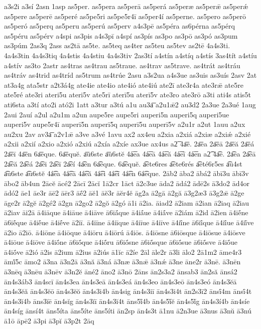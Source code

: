 {a3s2i
a3sí
2asn
1asp
as5per.
as5pera
as5perā
as5perá
as5peræ
as5perǣ
as5perǽ
as5pere
as5perē
as5peré
as5pe5ri
as5pe5r4ī
as5per4í
as5perne.
as5pero
as5perō
as5peró
as5perq
as5peru
as5perú
as5perv
a4s3pē
as5péra
as6pérna
as5pérq
as5péru
as5pérv
a4spi
as3pis
a4s3pī
a4spí
as3pís
as3po
as3pō
as3pó
as3pum
as3púm
2as3q
2ass
as2tā
as5te.
as5teq
as4ter
as5teu
as5tev
as2tē
4a4s3ti.
4a4s3tin
4a4s3tiq
4a4stis
4a4stiu
4a4s3tiv
2as3tí
a4stín
a4stíq
a4stís
3as4tít
a4stíu
a4stív
as3to
2astr
as4tras
as4trau
as5traue.
as4trav
as5trave.
as4trát
as4tráu
as4tráv
as4trid
as4tríd
as5trum
as4trúe
2asu
a3s2ua
a4s3ue
as3uis
as3uís
2asv
2at
at3a4g
ata5str
a2t3á4g
ate4ie
ate4io
ate4ió
ate4iú
ate2ī
ate3r4a
ate3rǣ
ate5re
ate5ré
ate3ri
ateri5u
ateri5v
ate5rī
aterī5u
aterī5v
ate3ro
ate3rō
a3ti
ati4s
atis5t
ati6sta
a3tí
ato2i
ató2i
1att
a3tur
a3tú
a1u
au3a͞
a2u1ǣ2
au3d2
2a3ue
2a3ué
1aug
2aui
2auí
a2ul
a2u1m
a2un
aupe5re
aupe5ri
auperi5n
auperi5q
auperi5ue
auperi5v
aupe5r4ī
auperī5n
auperī5q
auperī5u
auperī5v
a2u1r
a2ut
1auu
a2ux
au2xu
2av
av3a͞
a2v1ǣ
a3ve
a3vé
1avu
ax2
ax4eu
a2xia
a2xiá
a2xiæ
a2xiǽ
a2xié
a2xii
a2xií
a2xio
a2xió
a2xiú
a2xía
a2xíe
ax3ue
ax4us
a2͞
4a͞e.
2a͞ea
2a͞eā
2a͞eă
2a͞eá
2a͞eī
4a͞en
6a͞eque.
6a͞equĕ.
a͞u6ste
a͞u6stĕ
4á͞ea
4á͞eā
4á͞eă
4á͞eī
4á͞en
a2͡
4a͡e.
2a͡ea
2a͡eā
2a͡eă
2a͡eá
2a͡ei
2a͡eī
2a͡eí
4a͡en
6a͡eque.
6a͡equĕ.
a͡ete6res
a͡ete6rés
a͡eté6r5es
a͡u4st
a͡u6ste
a͡u6stĕ
4á͡ea
4á͡eā
4á͡eă
4á͡ei
4á͡eī
4á͡en
6á͡eque.
2āb2
āba2
ābá2
ābī3u
ābī3v
ābo2
āb4un
2ācĕ
ācé2
2ācī
2ācĭ
1ā2cr
1āct
ā2c3ue
āda2
ādá2
ādē2s
ā3do2
ād4or
ādó2
āe1
āe3r
āē2
āēr3
āḗ2
āĕ1
āĕ3r
āĕr4ĕ
āg2a
ā2gā
ā2gă
ā3g2æ3
ā3g2ǣ
ā2ge
āge2r
ā2gĕ
ā2gé2
ā2gn
ā2go2
ā2gŏ
ā2gó
ā1i
ā2ia.
āiad2
ā2iam
ā2ian
ā2iaq
ā2iau
ā2iav
āi2ā
ā4iāque
ā4iāue
ā4iāve
ā6iā́que
ā4iā́ue
ā4iā́ve
ā2iám
ā2id
ā2ien
ā4iḗne
ā6iḗque
ā4iḗue
ā4iḗve
ā2iī.
ā4iīne
ā4iīque
ā4iīue
ā4iīve
ā4iī́ne
ā6iī́que
ā4iī́ue
ā4iī́ve
ā2io
ā2iō.
ā4iōne
ā4iōque
ā4iōru
ā4iōrú
ā4iōs.
ā4iōsne
ā6iōsque
ā4iōsue
ā4iōsve
ā4iōue
ā4iōve
ā4iṓne
ā6iṓque
ā4iṓru
ā6iṓsne
ā6iṓsque
ā6iṓsue
ā6iṓsve
ā4iṓue
ā4iṓve
ā2ió
ā2is
ā2ium
ā2ius
ā2iús
ā1ĭc
ā2íe
2āl
āle2r
ā3li
ālo2
2ā1m2
āme4r3
āmĭ́5c
āmo2
ā3na
ā3n2ā
ā3nă
ā3ná
ā3næ
ā3nǣ
ā3nǽ
ā3ne
āne2r
ā3nē.
ā3nēn
ā3nēq
ā3nēu
ā3nēv
ā3n2ĕ
āné2
āno2
ā3nō
2āns
ān2s3a2
ānsab3
ān2să
ānsá2
ān4s3áb3
ān4scī
ān4s3ea
ān4s3eā
ān4s3eá
ān4s3eo
ān4s3eō
ān4s3eó
ān4s3ĕā
ān4s3ĕă
ān4s3ĕō
ān4s3ĕŏ
ān4s3i4b
ān4sig
ān4s3iī
ān4s3i4t
ān2s3ī2
ānsī́4m
ānsī́4t
ān4s3ĭ4b
āns3ĭē
ān4sĭg
ān4s3ĭī
ān4s3ĭ4t
āns5ĭ́4b
ān4s5ĭ́ĕ
ān4s5ĭ́g
ān4s3í4b
ān4síe
ān4síg
ānsí4t
āns5íta
āns5íte
āns5íti
ān2sp
ān4s3t
ā1nu
ā2n3ue
ā3nus
ā3nŭ
ā3nú
ā1ō
āpē2
ā3pi
ā3pĭ
ā3p2t
2āq
}
